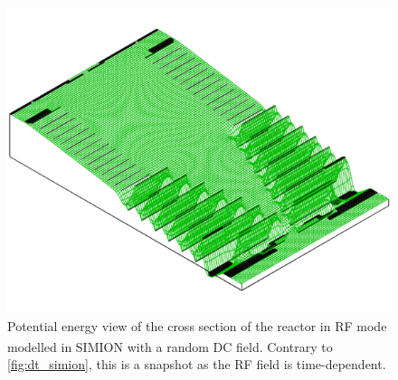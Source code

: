 \begin{figure}[t]
\centering
\includegraphics[width=0.6\linewidth]{pics/RF_SIMION.png}
\caption[Potential energy view of the cross section of the reactor in RF mode modelled in SIMION\textsuperscript{\textregistered} with a random DC field.]{Potential energy view of the cross section of the reactor in RF mode modelled in SIMION\textsuperscript{\textregistered} with a random DC field. Contrary to \autoref{fig:dt_simion}, this is a snapshot as the RF field is time-dependent.}
\label{fig:rfif_simion}
\end{figure}

